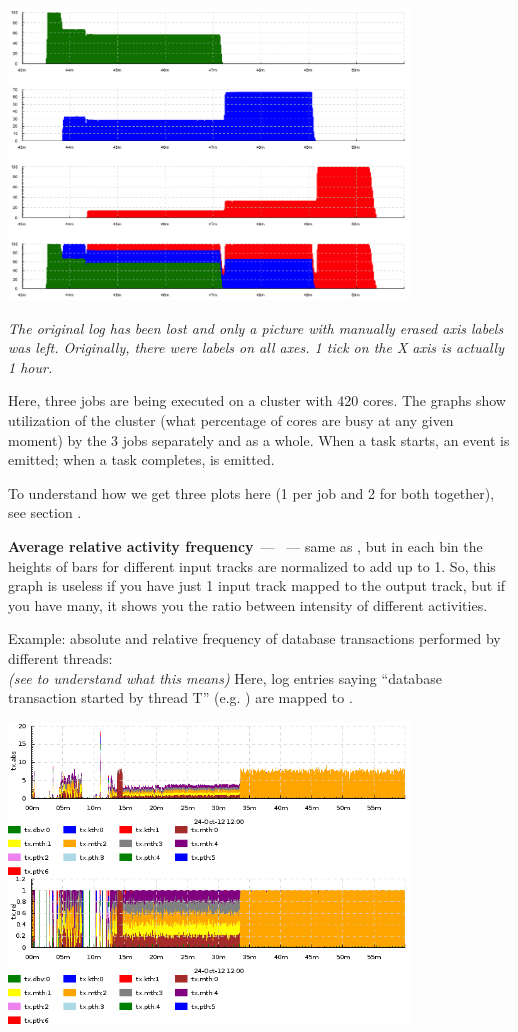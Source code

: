 \documentclass{article}
\begin{document}
\centerline{\includegraphics[width=0.8\textwidth]{pics/tplot/tplot-three-jobs.png}}

\emph{The original log has been lost and only a picture with manually erased axis labels was left. Originally, there were labels on all axes. 1 tick on the X axis is actually 1 hour.}

Here, three jobs are being executed on a cluster with 420 cores. The graphs show utilization of the cluster (what percentage of cores are busy at any given moment) by the 3 jobs separately and as a whole. When a task starts, an event  is emitted; when a task completes,  is emitted.

To understand how we get three plots here (1 per job and 2 for both together), see section .

\pagebreak
\noindent
\textbf{Average relative activity frequency}~--- ~--- same as , but in each bin the heights of bars for different input tracks are normalized to add up to 1. So, this graph is useless if you have just 1 input track mapped to the output track, but if you have many, it shows you the ratio between intensity of different activities.

Example: absolute and relative frequency of database transactions performed by different threads: \\
 \emph{(see  to understand what this means)} Here, log entries saying ``database transaction started by thread T'' (e.g. ) are mapped to .

\centerline{\includegraphics[width=0.8\textwidth]{pics/tplot/graphov-tx-acount-and-afreq.png}}
\end{document}
